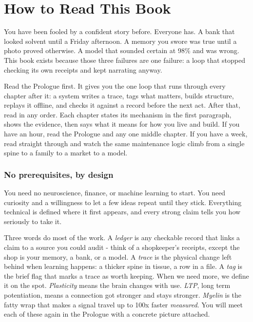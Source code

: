 \chapter{How to Read This Book}

You have been fooled by a confident story before. Everyone has. A bank that looked solvent until a Friday afternoon. A memory you swore was true until a photo proved otherwise. A model that sounded certain at 98\% and was wrong. This book exists because those three failures are one failure: a loop that stopped checking its own receipts and kept narrating anyway.

Read the Prologue first. It gives you the one loop that runs through every chapter after it: a system writes a trace, tags what matters, builds structure, replays it offline, and checks it against a record before the next act. After that, read in any order. Each chapter states its mechanism in the first paragraph, shows the evidence, then says what it means for how you live and build. If you have an hour, read the Prologue and any one middle chapter. If you have a week, read straight through and watch the same maintenance logic climb from a single spine to a family to a market to a model.

\subsection*{No prerequisites, by design}

You need no neuroscience, finance, or machine learning to start. You need curiosity and a willingness to let a few ideas repeat until they stick. Everything technical is defined where it first appears, and every strong claim tells you how seriously to take it.

Three words do most of the work. A \textit{ledger} is any checkable record that links a claim to a source you could audit - think of a shopkeeper's receipts, except the shop is your memory, a bank, or a model. A \textit{trace} is the physical change left behind when learning happens: a thicker spine in tissue, a row in a file. A \textit{tag} is the brief flag that marks a trace as worth keeping. When we need more, we define it on the spot. \textit{Plasticity} means the brain changes with use. \textit{LTP}, long term potentiation, means a connection got stronger and stays stronger. \textit{Myelin} is the fatty wrap that makes a signal travel up to 100x faster \textit{measured}. You will meet each of these again in the Prologue with a concrete picture attached.

